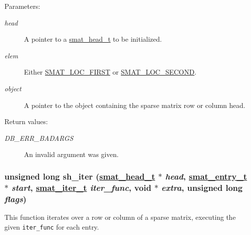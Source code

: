 \begin{Desc}
\item[Parameters:]
\begin{description}
\item[{\em head}]A pointer to a \hyperlink{group__dbprim__smat_a1}{smat\_\-head\_\-t} to be initialized. \item[{\em elem}]Either \hyperlink{group__dbprim__smat_a47a135}{SMAT\_\-LOC\_\-FIRST} or \hyperlink{group__dbprim__smat_a47a136}{SMAT\_\-LOC\_\-SECOND}. \item[{\em object}]A pointer to the object containing the sparse matrix row or column head.\end{description}
\end{Desc}
\begin{Desc}
\item[Return values:]
\begin{description}
\item[{\em DB\_\-ERR\_\-BADARGS}]An invalid argument was given. \end{description}
\end{Desc}
\hypertarget{group__dbprim__smat_a20}{
\subsubsection[sh\_\-iter]{\setlength{\rightskip}{0pt plus 5cm}unsigned long sh\_\-iter (\hyperlink{dbprim_8h_a1}{smat\_\-head\_\-t} $\ast$ {\em head}, \hyperlink{dbprim_8h_a2}{smat\_\-entry\_\-t} $\ast$ {\em start}, \hyperlink{dbprim_8h_a4}{smat\_\-iter\_\-t} {\em iter\_\-func}, void $\ast$ {\em extra}, unsigned long {\em flags})}}
\label{group__dbprim__smat_a20}


This function iterates over a row or column of a sparse matrix, executing the given {\tt iter\_\-func} for each entry.

